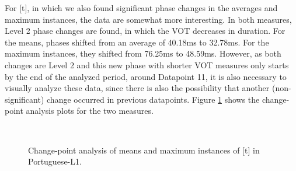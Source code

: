 For [t], in which we also found significant phase changes in the averages and
maximum instances, the data are somewhat more interesting. In both measures,
Level 2 phase changes are found, in which the VOT decreases in duration. For
the means, phases shifted from an average of 40.18ms to 32.78ms. For the
maximum instances, they shifted from 76.25ms to 48.59ms. However, as both
changes are Level 2 and this new phase with shorter VOT measures only starts by
the end of the analyzed period, around Datapoint 11, it is also necessary to
visually analyze these data, since there is also the possibility that another
(non-significant) change occurred in previous datapoints. Figure
\ref{laura-fig04} shows the change-point analysis plots for the two measures.

\begin{figure}[h]
\centering
{} \qquad
{} \\
 \qquad
{} 
\caption{Change-point analysis of means and maximum instances of [t] in Portuguese-L1.}
\label{laura-fig04}
\end{figure}


